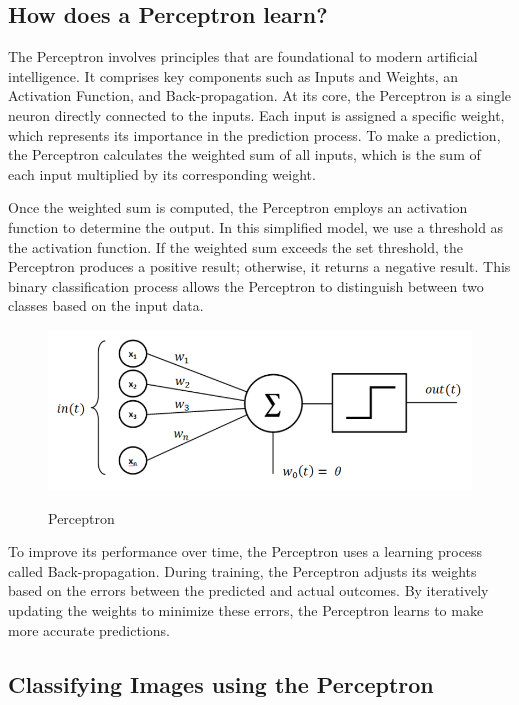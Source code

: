\documentclass{article}
\begin{document}
\subsection{How does a Perceptron learn?}

The Perceptron involves principles that are foundational to modern artificial intelligence. It comprises key components such as Inputs and Weights, an Activation Function, and Back-propagation. At its core, the Perceptron is a single neuron directly connected to the inputs. Each input is assigned a specific weight, which represents its importance in the prediction process. To make a prediction, the Perceptron calculates the weighted sum of all inputs, which is the sum of each input multiplied by its corresponding weight.

Once the weighted sum is computed, the Perceptron employs an activation function to determine the output. In this simplified model, we use a threshold as the activation function. If the weighted sum exceeds the set threshold, the Perceptron produces a positive result; otherwise, it returns a negative result. This binary classification process allows the Perceptron to distinguish between two classes based on the input data.

\begin{figure}[ht]
    \caption{Perceptron}
    \centering
    \includegraphics[width=0.75\linewidth]{assets/perceptron/perceptron.png}
    \label{fig:perceptron}
\end{figure}

To improve its performance over time, the Perceptron uses a learning process called Back-propagation. During training, the Perceptron adjusts its weights based on the errors between the predicted and actual outcomes. By iteratively updating the weights to minimize these errors, the Perceptron learns to make more accurate predictions.

\subsection{Classifying Images using the Perceptron}
\end{document}
